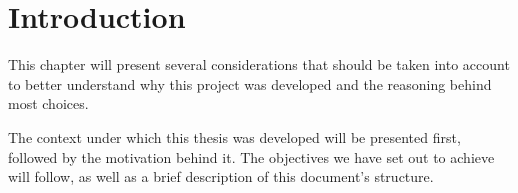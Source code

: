 \chapter{Introduction} \label{sec:intro}

This chapter will present several considerations that should be taken into account to better understand why this project was developed and the reasoning behind most choices.

The context under which this thesis was developed will be presented first, followed by the motivation behind it.
The objectives we have set out to achieve will follow, as well as a brief description of this document's structure.








